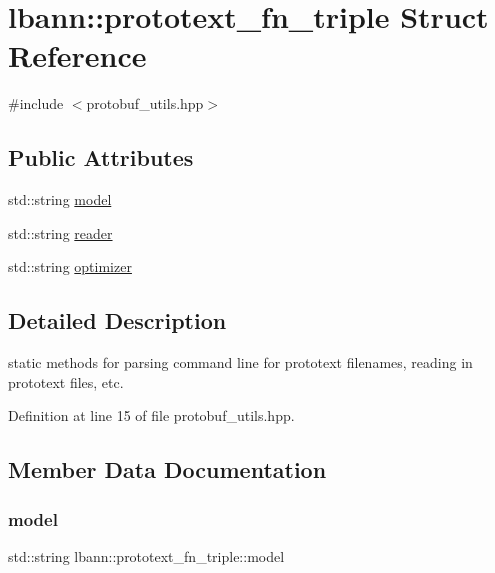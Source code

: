 \hypertarget{structlbann_1_1prototext__fn__triple}{}\section{lbann\+:\+:prototext\+\_\+fn\+\_\+triple Struct Reference}
\label{structlbann_1_1prototext__fn__triple}


{\ttfamily \#include $<$protobuf\+\_\+utils.\+hpp$>$}

\subsection*{Public Attributes}
\begin{DoxyCompactItemize}
\item 
std\+::string \hyperlink{structlbann_1_1prototext__fn__triple_a5e90bdc322ecd0fb0701ad8554dc10e1}{model}
\item 
std\+::string \hyperlink{structlbann_1_1prototext__fn__triple_a6b8674014fe4a2ba4a0eb4eff4e927ed}{reader}
\item 
std\+::string \hyperlink{structlbann_1_1prototext__fn__triple_a223cbc06d9f15e322a3472b991137be4}{optimizer}
\end{DoxyCompactItemize}


\subsection{Detailed Description}
static methods for parsing command line for prototext filenames, reading in prototext files, etc. 

Definition at line 15 of file protobuf\+\_\+utils.\+hpp.



\subsection{Member Data Documentation}
\mbox{\label{structlbann_1_1prototext__fn__triple_a5e90bdc322ecd0fb0701ad8554dc10e1}} 
\subsubsection{\texorpdfstring{model}{model}}
{\footnotesize\ttfamily std\+::string lbann\+::prototext\+\_\+fn\+\_\+triple\+::model}



